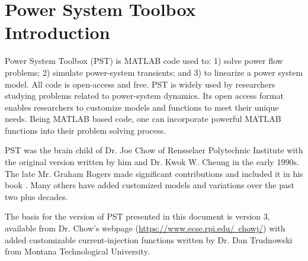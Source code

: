 \vspace{2em} %
\chapter*{Power System Toolbox Introduction}


Power System Toolbox (PST) is MATLAB code used to: 1) solve power flow problems; 2) simulate power-system transients; and 3) to linearize a power system model.  
All code is open-access and free.  
PST is widely used by researchers studying problems related to power-system dynamics.  
Its open access format enables researchers to customize models and functions to meet their unique needs.  
Being MATLAB based code, one can incorporate powerful MATLAB functions into their problem solving process.

\vspace{1em}
PST was the brain child of Dr. Joe Chow of Rensselaer Polytechnic Institute with the original version written by him and Dr. Kwok W. Cheung in the early 1990s.  
The late Mr. Graham Rogers made significant contributions and included it in his book \cite{rogers1999}.  
Many others have added customized models and variations over the past two plus decades. 

\vspace{1em}
The basis for the version of PST presented in this document is version 3, available from Dr. Chow’s webpage (\href{https://www.ecse.rpi.edu/~chowj/}{https://www.ecse.rpi.edu/~chowj/}) with added customizable current-injection functions written by Dr. Dan Trudnowski from Montana Technological University.